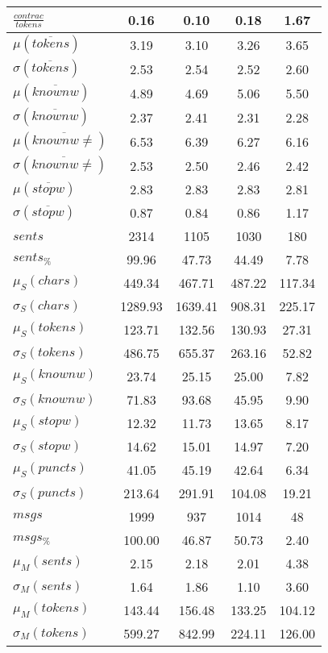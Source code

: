 \begin{table}[h!]
\begin{center}
\begin{tabular}{| l || c | c | c | c |}
$\frac{contrac}{tokens}$ & 0.16  & 0.10  & 0.18  & 1.67 \\\hline\hline
$\mu(\overline{tokens})$ & 3.19  & 3.10  & 3.26  & 3.65 \\
$\sigma(\overline{tokens})$ & 2.53  & 2.54  & 2.52  & 2.60 \\\hline
$\mu(\overline{knownw})$ & 4.89  & 4.69  & 5.06  & 5.50 \\
$\sigma(\overline{knownw})$ & 2.37  & 2.41  & 2.31  & 2.28 \\\hline
$\mu(\overline{knownw \neq})$ & 6.53  & 6.39  & 6.27  & 6.16 \\
$\sigma(\overline{knownw \neq})$ & 2.53  & 2.50  & 2.46  & 2.42 \\\hline
$\mu(\overline{stopw})$ & 2.83  & 2.83  & 2.83  & 2.81 \\
$\sigma(\overline{stopw})$ & 0.87  & 0.84  & 0.86  & 1.17 \\\hline\hline
$sents$ & 2314  & 1105  & 1030  & 180 \\
$sents_{\%}$ & 99.96  & 47.73  & 44.49  & 7.78 \\\hline
$\mu_S(chars)$ & 449.34  & 467.71  & 487.22  & 117.34 \\
$\sigma_S(chars)$ & 1289.93  & 1639.41  & 908.31  & 225.17 \\\hline
$\mu_S(tokens)$ & 123.71  & 132.56  & 130.93  & 27.31 \\
$\sigma_S(tokens)$ & 486.75  & 655.37  & 263.16  & 52.82 \\\hline
$\mu_S(knownw)$ & 23.74  & 25.15  & 25.00  & 7.82 \\
$\sigma_S(knownw)$ & 71.83  & 93.68  & 45.95  & 9.90 \\\hline
$\mu_S(stopw)$ & 12.32  & 11.73  & 13.65  & 8.17 \\
$\sigma_S(stopw)$ & 14.62  & 15.01  & 14.97  & 7.20 \\\hline
$\mu_S(puncts)$ & 41.05  & 45.19  & 42.64  & 6.34 \\
$\sigma_S(puncts)$ & 213.64  & 291.91  & 104.08  & 19.21 \\\hline\hline
$msgs$ & 1999  & 937  & 1014  & 48 \\
$msgs_{\%}$ & 100.00  & 46.87  & 50.73  & 2.40 \\\hline
$\mu_M(sents)$ & 2.15  & 2.18  & 2.01  & 4.38 \\
$\sigma_M(sents)$ & 1.64  & 1.86  & 1.10  & 3.60 \\\hline
$\mu_M(tokens)$ & 143.44  & 156.48  & 133.25  & 104.12 \\
$\sigma_M(tokens)$ & 599.27  & 842.99  & 224.11  & 126.00 \\\hline

\end{tabular}
\end{center}
\end{table}
